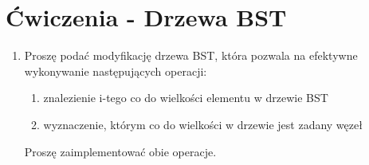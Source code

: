 \documentclass[11pt]{article}
\begin{document}
\section{Ćwiczenia - Drzewa BST}

\begin{enumerate}
	
	\item Proszę podać modyfikację drzewa BST, która pozwala na efektywne
	wykonywanie następujących operacji:
	\begin{enumerate}
		\item znalezienie i-tego co do wielkości elementu w drzewie BST
		\item wyznaczenie, którym co do wielkości w drzewie jest zadany węzeł
	\end{enumerate}
	Proszę zaimplementować obie operacje.
	
\end{enumerate}
\end{document}
